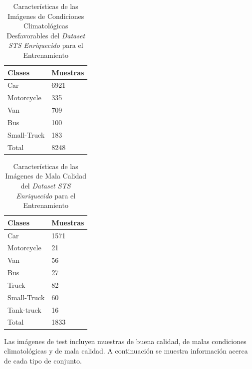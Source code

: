 \begin{table}[H]
\begin{center}
\begin{tabular}{|l|l|}
\hline
Clases & Muestras \\
\hline \hline
Car & 6921 \\ \hline
Motorcycle & 335 \\ \hline
Van & 709 \\ \hline
Bus & 100 \\ \hline
Small-Truck & 183 \\ \hline
Total & 8248 \\ \hline
\end{tabular}
\caption{Características de las Imágenes de Condiciones Climatológicas Desfavorables del \textit{Dataset STS Enriquecido} para el Entrenamiento}
\label{tabla_redes_database_malas_condiciones}
\end{center}
\end{table}

\begin{table}[H]
\begin{center}
\begin{tabular}{|l|l|}
\hline
Clases & Muestras \\
\hline \hline
Car & 1571 \\ \hline
Motorcycle & 21 \\ \hline
Van & 56 \\ \hline
Bus & 27 \\ \hline
Truck & 82 \\ \hline
Small-Truck & 60 \\ \hline
Tank-truck & 16 \\ \hline
Total & 1833 \\ \hline
\end{tabular}
\caption{Características de las Imágenes de Mala Calidad del \textit{Dataset STS Enriquecido} para el Entrenamiento}
\label{tabla_redes_database_mala_calidad}
\end{center}
\end{table}

Las imágenes de test incluyen muestras de buena calidad, de malas condiciones climatológicas y de mala calidad. A continuación se muestra información acerca de cada tipo de conjunto.

